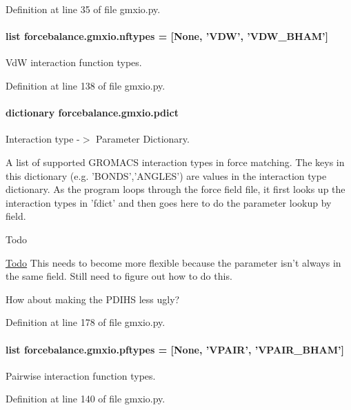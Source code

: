 Definition at line 35 of file gmxio.\-py.

\hypertarget{namespaceforcebalance_1_1gmxio_a337bc61280b58a43319380dec9c5529a}{
\paragraph[{nftypes}]{\setlength{\rightskip}{0pt plus 5cm}list forcebalance.\-gmxio.\-nftypes = \mbox{[}None, 'V\-D\-W', 'V\-D\-W\-\_\-\-B\-H\-A\-M'\mbox{]}}}\label{namespaceforcebalance_1_1gmxio_a337bc61280b58a43319380dec9c5529a}


Vd\-W interaction function types. 



Definition at line 138 of file gmxio.\-py.

\hypertarget{namespaceforcebalance_1_1gmxio_ae845e0b923ecde16c79f2742b94534a6}{
\paragraph[{pdict}]{\setlength{\rightskip}{0pt plus 5cm}dictionary forcebalance.\-gmxio.\-pdict}}\label{namespaceforcebalance_1_1gmxio_ae845e0b923ecde16c79f2742b94534a6}


Interaction type -\/$>$ Parameter Dictionary. 

A list of supported G\-R\-O\-M\-A\-C\-S interaction types in force matching. The keys in this dictionary (e.\-g. 'B\-O\-N\-D\-S','A\-N\-G\-L\-E\-S') are values in the interaction type dictionary. As the program loops through the force field file, it first looks up the interaction types in 'fdict' and then goes here to do the parameter lookup by field. \begin{DoxyRefDesc}{Todo}
\item[\hyperlink{todo__todo000010}{Todo}]This needs to become more flexible because the parameter isn't always in the same field. Still need to figure out how to do this. 

How about making the P\-D\-I\-H\-S less ugly? \end{DoxyRefDesc}


Definition at line 178 of file gmxio.\-py.

\hypertarget{namespaceforcebalance_1_1gmxio_a59695b79df36efbe64ac88fd64bfb366}{
\paragraph[{pftypes}]{\setlength{\rightskip}{0pt plus 5cm}list forcebalance.\-gmxio.\-pftypes = \mbox{[}None, 'V\-P\-A\-I\-R', 'V\-P\-A\-I\-R\-\_\-\-B\-H\-A\-M'\mbox{]}}}\label{namespaceforcebalance_1_1gmxio_a59695b79df36efbe64ac88fd64bfb366}


Pairwise interaction function types. 



Definition at line 140 of file gmxio.\-py.

